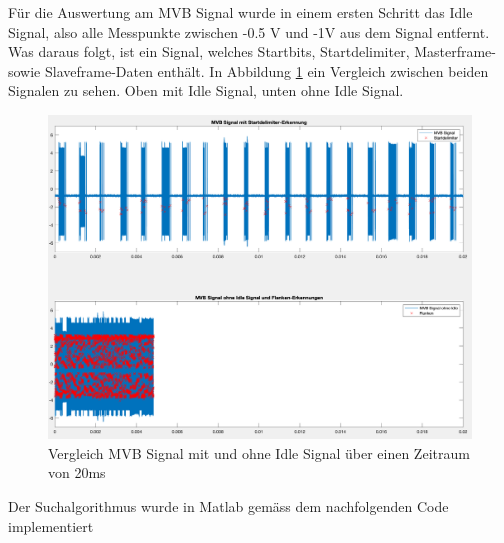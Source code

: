 Für die Auswertung am MVB Signal wurde in einem ersten Schritt das Idle Signal, also alle Messpunkte zwischen -0.5 V und -1V aus dem Signal entfernt. Was daraus folgt, ist ein Signal, welches Startbits, Startdelimiter, Masterframe- sowie Slaveframe-Daten enthält. In Abbildung \ref{fig:ReineDaten} ein Vergleich zwischen beiden Signalen zu sehen. Oben mit Idle Signal, unten ohne Idle Signal.

\begin{figure}[H]
    \centering
    \includegraphics[width=0.75\linewidth]{Figures/Chap3/Busauslastung/Vergleich_MVB_mit_ohne_Idle.png}
    \caption{Vergleich MVB Signal mit und ohne Idle Signal über einen Zeitraum von 20ms}
    \label{fig:ReineDaten}
\end{figure}

Der Suchalgorithmus wurde in Matlab gemäss dem nachfolgenden Code implementiert

